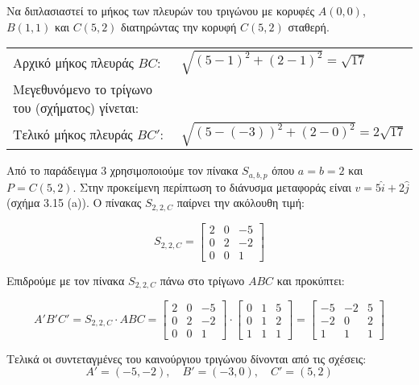 \begin{example}
Να διπλασιαστεί το μήκος των πλευρών του τριγώνου με κορυφές $A(0,0)$, $B(1,1)$ και $C(5,2)$ διατηρώντας την κορυφή $C(5,2)$ σταθερή.
\end{example}
\begin{solution}
	


%
\begin{flushleft}
\renewcommand{\arraystretch}{1.5} 
\begin{tabular}{m{}m{}}
Αρχικό μήκος πλευράς $BC$: & $\sqrt{(5-1)^2 + (2-1)^2} = \sqrt{17}$ \\
Μεγεθυνόμενο το τρίγωνο του (σχήματος) γίνεται: & \\
Τελικό μήκος πλευράς $BC'$: & $\sqrt{(5-(-3))^2 + (2-0)^2} = 2 \sqrt{17}$
\end{tabular}
\renewcommand{\arraystretch}{1}
\end{flushleft}

Από το παράδειγμα 3 χρησιμοποιούμε τον πίνακα $S_{a,b,p}$ όπου $a=b=2$ και $P=C(5,2)$. Στην προκείμενη περίπτωση το διάνυσμα μεταφοράς είναι $v=5\hat{i}+2\hat{j}$ (σχήμα 3.15 (a)). Ο πίνακας $S_{2,2,C}$ παίρνει την ακόλουθη τιμή:

\[
S_{2,2,C} = \begin{bmatrix}
2 & 0 & -5 \\
0 & 2 & -2 \\
0 & 0 & 1
\end{bmatrix}
\]

Επιδρούμε με τον πίνακα $S_{2,2,C}$ πάνω στο τρίγωνο $ABC$ και προκύπτει:

\[
A'B'C' = S_{2,2,C} \cdot ABC = \begin{bmatrix}
2 & 0 & -5 \\
0 & 2 & -2 \\
0 & 0 & 1
\end{bmatrix} \cdot \begin{bmatrix}
0 & 1 & 5 \\
0 & 1 & 2 \\
1 & 1 & 1
\end{bmatrix} = \begin{bmatrix}
-5 & -2 & 5 \\
-2 & 0 & 2 \\
1 & 1 & 1
\end{bmatrix}
\]

Τελικά οι συντεταγμένες του καινούργιου τριγώνου δίνονται από τις σχέσεις:
\[
A' = (-5, -2), \quad B' = (-3, 0), \quad C' = (5, 2)
\]

\end{solution}